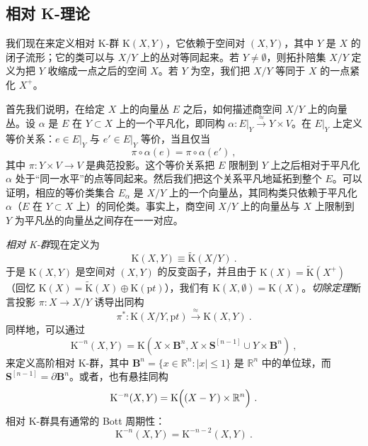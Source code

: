 \documentclass[11pt,a4paper]{ctexart}
\newcommand{\SrcRange}[2]{\marginpar{\raggedright\footnotesize 原文 p.#1}}
\begin{document}
\SrcRange{20}{20}
\subsection{相对 K-理论}\label{ux76f8ux5bf9-k-ux7406ux8bba}

我们现在来定义相对 K-群 \({\mathrm K}(X,Y)\)，它依赖于空间对 \((X,Y)\)，其中 \(Y\) 是 \(X\) 的闭子流形；它的类可以与 \(X/Y\) 上的丛对等同起来。若 \(Y\neq
\emptyset\)，则拓扑陪集 \(X/Y\) 定义为把 \(Y\) 收缩成一点之后的空间 \(X\)。若 \(Y\) 为空，我们把 \(X/Y\) 等同于 \(X\) 的一点紧化 \(X^+\)。

首先我们说明，在给定 \(X\) 上的向量丛 \(E\) 之后，如何描述商空间 \(X/Y\) 上的向量丛。设 \(\alpha\) 是 \(E\) 在 \(Y\subset X\) 上的一个平凡化，即同构 \(\alpha:
E|_{Y}\stackrel{\approx}{\rightarrow}Y\times V\)。在 \(E|_{Y}\) 上定义等价关系：\(e\in E|_Y\) 与 \(e'\in E|_Y\) 等价，当且仅当 \[\pi\circ\alpha(e)=\pi\circ\alpha(e')\ ,\] 其中 \(\pi:Y\times V\rightarrow V\) 是典范投影。这个等价关系把 \(E\) 限制到 \(Y\) 上之后相对于平凡化 \(\alpha\) 处于``同一水平''的点等同起来。然后我们把这个关系平凡地延拓到整个 \(E\)。可以证明，相应的等价类集合 \(E_{\alpha}\) 是 \(X/Y\) 上的一个向量丛，其同构类只依赖于平凡化 \(\alpha\)（\(E\) 在 \(Y\subset X\) 上）的同伦类。事实上，商空间 \(X/Y\) 上的向量丛与 \(X\) 上限制到 \(Y\) 为平凡丛的向量丛之间存在一一对应。

\emph{相对 K-群}现在定义为 \[{\mathrm K}(X,Y)\equiv \widetilde{{\mathrm K}}(X/Y)\ .\] 于是 \({\mathrm K}(X,Y)\) 是空间对 \((X,Y)\) 的反变函子，并且由于 \({\mathrm K}(X)=\widetilde{{\mathrm K}}(X^+)\)（回忆 \({\mathrm K}(X)= \widetilde{{\mathrm K}}(X)\oplus {\mathrm K}({\mathrm
pt})\)），我们有 \({\mathrm K}(X,\emptyset)={\mathrm K}(X)\)。\emph{切除定理}断言投影 \(\pi:X\rightarrow X/Y\) 诱导出同构 \[\pi^*: {\mathrm K}(X/Y, {\mathrm pt})\stackrel{\approx}{\longrightarrow}{\mathrm K}(X,Y)\ .\] 同样地，可以通过 \[{\mathrm K}^{-n}(X,Y)={\mathrm K}(X\times {\mathbf B}^n,X\times {\mathbf S}^[n-1]\cup Y\times {\mathbf
B}^n)\ ,\] 来定义高阶相对 K-群，其中 \({\mathbf B}^n=\{ x\in {\mathbb{R}}^n: | x|\leq1\}\) 是 \({\mathbb{R}}^n\) 中的单位球，而 \({\mathbf S}^[n-1]=\partial{\mathbf B}^n\)。或者，也有悬挂同构 \[{\mathrm K}^{-n}(X,Y)={\mathrm K}\Bigl((X-Y)\times {\mathbb{R}}^n\Bigr)\ .\] 相对 K-群具有通常的 Bott 周期性： \[{\mathrm K}^{-n}(X,Y)= {\mathrm K}^{-n-2}(X,Y)\ .\]
\end{document}
